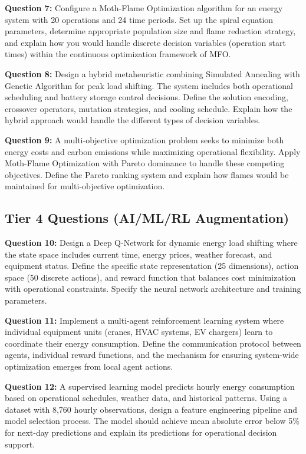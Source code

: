 \documentclass{article}
\begin{document}
\textbf{Question 7:} Configure a Moth-Flame Optimization algorithm for an energy system with 20 operations and 24 time periods. Set up the spiral equation parameters, determine appropriate population size and flame reduction strategy, and explain how you would handle discrete decision variables (operation start times) within the continuous optimization framework of MFO.

\textbf{Question 8:} Design a hybrid metaheuristic combining Simulated Annealing with Genetic Algorithm for peak load shifting. The system includes both operational scheduling and battery storage control decisions. Define the solution encoding, crossover operators, mutation strategies, and cooling schedule. Explain how the hybrid approach would handle the different types of decision variables.

\textbf{Question 9:} A multi-objective optimization problem seeks to minimize both energy costs and carbon emissions while maximizing operational flexibility. Apply Moth-Flame Optimization with Pareto dominance to handle these competing objectives. Define the Pareto ranking system and explain how flames would be maintained for multi-objective optimization.

\subsection{Tier 4 Questions (AI/ML/RL Augmentation)}

\textbf{Question 10:} Design a Deep Q-Network for dynamic energy load shifting where the state space includes current time, energy prices, weather forecast, and equipment status. Define the specific state representation (25 dimensions), action space (50 discrete actions), and reward function that balances cost minimization with operational constraints. Specify the neural network architecture and training parameters.

\textbf{Question 11:} Implement a multi-agent reinforcement learning system where individual equipment units (cranes, HVAC systems, EV chargers) learn to coordinate their energy consumption. Define the communication protocol between agents, individual reward functions, and the mechanism for ensuring system-wide optimization emerges from local agent actions.

\textbf{Question 12:} A supervised learning model predicts hourly energy consumption based on operational schedules, weather data, and historical patterns. Using a dataset with 8,760 hourly observations, design a feature engineering pipeline and model selection process. The model should achieve mean absolute error below 5\% for next-day predictions and explain its predictions for operational decision support.
\end{document}
